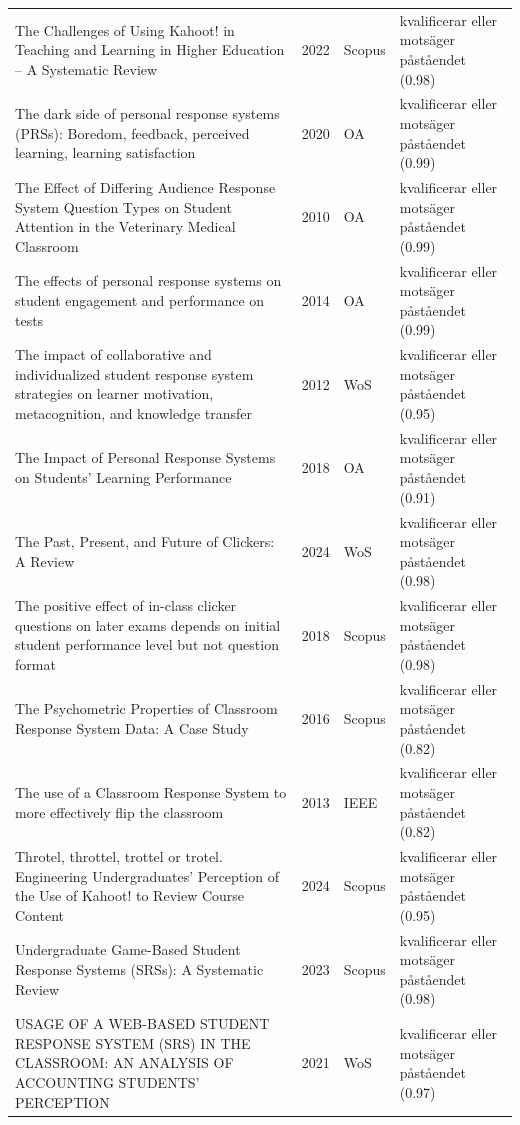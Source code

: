 \begin{longtable}{@{}%
  >{\raggedright\arraybackslash}p{}c%
  >{\raggedright\arraybackslash}p{}%
  >{\raggedright\arraybackslash}p{}@{}}
The Challenges of Using Kahoot! in Teaching and Learning in Higher Education -- A Systematic Review & 2022 & Scopus & kvalificerar eller motsäger påståendet (0.98) \\
The dark side of personal response systems (PRSs): Boredom, feedback, perceived learning, learning satisfaction & 2020 & OA & kvalificerar eller motsäger påståendet (0.99) \\
The Effect of Differing Audience Response System Question Types on Student Attention in the Veterinary Medical Classroom & 2010 & OA & kvalificerar eller motsäger påståendet (0.99) \\
The effects of personal response systems on student engagement and performance on tests & 2014 & OA & kvalificerar eller motsäger påståendet (0.99) \\
The impact of collaborative and individualized student response system strategies on learner motivation, metacognition, and knowledge transfer & 2012 & WoS & kvalificerar eller motsäger påståendet (0.95) \\
The Impact of Personal Response Systems on Students' Learning Performance & 2018 & OA & kvalificerar eller motsäger påståendet (0.91) \\
The Past, Present, and Future of Clickers: A Review & 2024 & WoS & kvalificerar eller motsäger påståendet (0.98) \\
The positive effect of in-class clicker questions on later exams depends on initial student performance level but not question format & 2018 & Scopus & kvalificerar eller motsäger påståendet (0.98) \\
The Psychometric Properties of Classroom Response System Data: A Case Study & 2016 & Scopus & kvalificerar eller motsäger påståendet (0.82) \\
The use of a Classroom Response System to more effectively flip the classroom & 2013 & IEEE & kvalificerar eller motsäger påståendet (0.82) \\
Throtel, throttel, trottel or trotel. Engineering Undergraduates' Perception of the Use of Kahoot! to Review Course Content & 2024 & Scopus & kvalificerar eller motsäger påståendet (0.95) \\
Undergraduate Game-Based Student Response Systems (SRSs): A Systematic Review & 2023 & Scopus & kvalificerar eller motsäger påståendet (0.98) \\
USAGE OF A WEB-BASED STUDENT RESPONSE SYSTEM (SRS) IN THE CLASSROOM: AN ANALYSIS OF ACCOUNTING STUDENTS' PERCEPTION & 2021 & WoS & kvalificerar eller motsäger påståendet (0.97) \\

\end{longtable}

